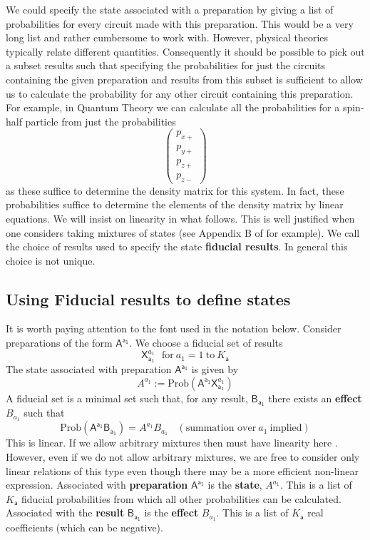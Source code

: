 \documentclass[10pt]{article}
\begin{document}
We could specify the state associated with a preparation by giving a list of probabilities for every circuit made with this preparation.   This would be a very long list and rather cumbersome to work with. However, physical theories typically relate different quantities.  Consequently it should be possible to pick out a subset results such that specifying the probabilities for just the circuits containing the given preparation and results from this subset is sufficient to allow us to calculate the probability for any other circuit containing this preparation.  For example, in Quantum Theory we can calculate all the probabilities for a spin-half particle from just the probabilities
\[
\left( \begin{array}{c} p_{x+} \\  p_{y+} \\ p_{z+} \\ p_{z-} \end{array} \right)
\]
as these suffice to determine the density matrix for this system.  In fact, these probabilities suffice to determine the elements of the density matrix by linear equations.  We will insist on linearity in what follows.  This is well justified when one considers taking mixtures of states (see Appendix B of \cite{hardy2011reformulating} for example).  We call the choice of results used to specify the state {\bf fiducial results}.  In general this choice is not unique.



\subsection{Using Fiducial results to define states}

It is worth paying attention to the font used in the notation below.  Consider preparations of the form $\mathsf{A^{a_1}}$.  We choose a fiducial set of results
\[
\mathsf{X}_\mathsf{a_1}^{a_1} ~~~\text{for} ~a_1 = 1 ~\text{to}~ K_\mathsf{a}
\]
The state associated with preparation $\mathsf{A^{a_1}}$ is given by
\[
A^{a_1} := \text{Prob}(\mathsf{A^{a_1}} \mathsf{X}_\mathsf{a_1}^{a_1} )
\]
A fiducial set is a minimal set such that, for any result, $\mathsf{B_{a_1}}$ there exists an {\bf effect} $B_{a_1}$ such that
\[ \text{Prob}(\mathsf{A^{a_1}B_{a_1}}) = A^{a_1} B_{a_1} ~~~~ (\text{summation over}~a_1~\text{implied})\]
This is linear.  If we allow arbitrary mixtures then must have linearity here \cite{hardy2011reformulating}.  However, even if we do not allow arbitrary mixtures, we are free to consider only linear relations of this type even though there may be a more efficient non-linear expression.  Associated with {\bf preparation} $\mathsf{A^{a_1}}$ is the {\bf state}, $A^{a_1}$.  This is a list of $K_\mathsf{a}$ fiducial probabilities from which all other probabilities can be calculated.  Associated with the {\bf result} $\mathsf{B_{a_1}}$ is the {\bf effect} $B_{a_1}$. This is a list of $K_\mathsf{a}$ real coefficients (which can be negative).   
\end{document}
